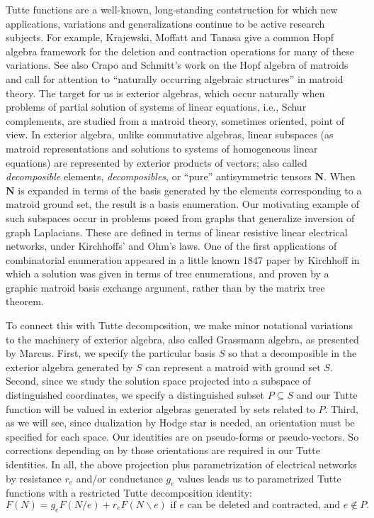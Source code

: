 \documentclass[Unicode]{cedram-alco}
\newcommand{\ext}[1]{\ensuremath{\mathbf{#1}}}
\begin{document}
Tutte functions are a well-known, long-standing contstruction
for which new applications, variations and generalizations
continue to be active research subjects. For example,
Krajewski, Moffatt and Tanasa give a common Hopf algebra framework
for the deletion and contraction operations for many of
these variations\cite{KRAJEWSKI2018271}.
See also Crapo and Schmitt's work
on the Hopf algebra of matroids and call
for attention to ``naturally occurring algebraic
structures'' in matroid theory\cite{CRAPO20051066}.  The target for us
is exterior algebras, which occur naturally when problems of
partial solution of systems of linear equations\cite{ExteriorAlgInLinalgRef},
i.e., Schur complements,
are studied from a matroid theory, sometimes oriented, point of view.
In exterior algebra, unlike commutative algebras,
linear subspaces (as matroid representations and
solutions to systems of homogeneous linear equations)
are represented by exterior products of vectors; also called
\emph{decomposible} elements, \emph{decomposibles},
or ``pure'' antisymmetric tensors $\ext{N}$.
When $\ext{N}$ is expanded in terms of the basis
generated by the elements corresponding to a matroid
ground set, the result is a basis enumeration.
Our motivating example of such subspaces occur
in problems posed from graphs that generalize inversion
of graph Laplacians.  These are defined in
terms of linear resistive linear electrical networks,
under Kirchhoffs' and Ohm's laws.  One of the
first applications of combinatorial enumeration
appeared in a little known 1847 paper by Kirchhoff\cite{Kirchhoff}
in which a solution was given in terms of tree enumerations,
and proven by a graphic matroid basis exchange argument, rather
than by the matrix tree theorem.

To connect this with Tutte decomposition, we make
minor notational variations to the machinery of exterior algebra,
also called Grassmann algebra,
as presented by Marcus\cite{MarcusFDMuAlPt2}.  First, we specify the particular basis $S$
so that a decomposible in the exterior algebra generated by $S$
can represent a matroid with ground set $S$.
Second, since we study the solution space projected
into a subspace of distinguished coordinates, we
specify a distinguished subset $P\subseteq S$
and our Tutte function will be valued in exterior algebras generated by sets related to $P$.
Third, as we will see, since dualization by Hodge star is needed,
an orientation must be specified for each space.
Our identities are on pseudo-forms or pseudo-vectors\cite{Frankel}.
So corrections depending on by those orientations
are required in our Tutte identities.  In all, the above projection plus
parametrization of
electrical networks by resistance $r_e$ and/or conductance $g_e$ values
leads us to parametrized Tutte functions with a
restricted Tutte decomposition identity:
\begin{equation}\label{ParamTutteEqGeneric}
   F(N) = g_eF(N/e)+r_eF(N\backslash e) \text{ if\ }e\text{ can be deleted and contracted, and }e\not\in P.
\end{equation}
\end{document}

